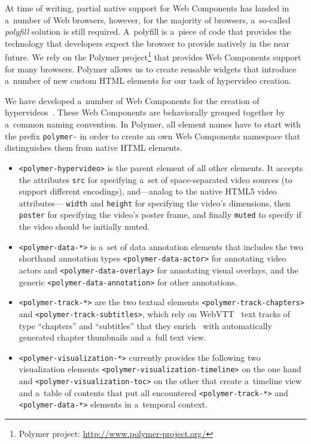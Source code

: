 \documentclass[conference]{IEEEtran}
\begin{document}
\noindent At time of writing, partial native support for Web Components
has landed in a~number of Web browsers,
however, for the majority of browsers,
a~so-called \emph{polyfill} solution is still required.
A~polyfill  is a~piece of code that provides the technology
that developers expect the browser to provide natively in the near future.
We rely on the Polymer project\footnote{Polymer project:
\url{http://www.polymer-project.org/}}
that provides Web Components support for many browsers.
Polymer allows us to create reusable widgets that introduce a~number of new
custom HTML elements for our task of hypervideo creation.

We have developed a~number of Web Components for the creation of hypervideos~\cite{steiner2014hypervideo}.
These Web Components are behaviorally grouped together
by a~common naming convention.
In Polymer, all element names have to start with the prefix \texttt{polymer-}
in order to create an own Web Components namespace
that distinguishes them from native HTML elements.

\begin{itemize}
  \item \texttt{<polymer-hypervideo>} is the parent element of all other elements.
    It accepts the attributes \texttt{src} for specifying a~set of
    space-separated video sources (to support different encodings),
    and---analog to the native HTML5 video attributes---%
    \texttt{width} and \texttt{height} for specifying the video's dimensions,
    then \texttt{poster} for specifying the video's poster frame, and finally \texttt{muted} to specify if the video should be initially muted.
  \item \texttt{<polymer-data-*>} is a~set of data annotation elements
    that includes the two shorthand annotation types
    \texttt{<polymer-data-actor>} for annotating video actors and
    \texttt{<polymer-data-overlay>} for annotating visual overlays,
    and the generic \texttt{<polymer-data-annotation>} for other annotations.
  \item \texttt{<polymer-track-*>} are the two textual elements
    \texttt{<polymer-track-chapters>} and \texttt{<polymer-track-subtitles>},
    which rely on WebVTT~\cite{pfeiffer2013webvtt} text tracks
    of type ``chapters'' and ``subtitles'' that they enrich~\cite{steiner2014webvtt} with
    automatically generated chapter thumbnails and a~full text view.
  \item \texttt{<polymer-visualization-*>} currently provides the
    following two visualization elements
    \texttt{<polymer-visualization-timeline>} on the one hand and 
    \texttt{<polymer-visualization-toc>} on the other
    that create a~timeline view and a~table of contents
    that put all encountered \texttt{<polymer-track-*>}
    and \texttt{<polymer-data-*>} elements in a~temporal context.
\end{itemize}
\end{document}
